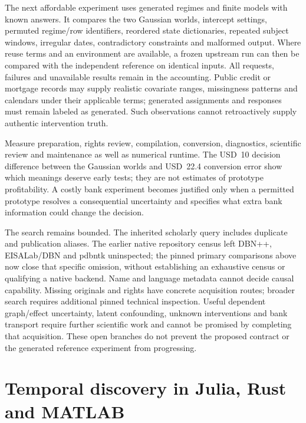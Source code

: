 The next affordable experiment uses generated regimes and finite models with
known answers. It compares the two Gaussian worlds, intercept settings,
permuted regime/row identifiers, reordered state dictionaries, repeated subject
windows, irregular dates, contradictory constraints and malformed output.
Where reuse terms and an environment are available, a frozen upstream run can
then be compared with the independent reference on identical inputs. All
requests, failures and unavailable results remain in the accounting. Public
credit or mortgage records may supply realistic covariate ranges, missingness
patterns and calendars under their applicable terms; generated assignments
and responses must remain labeled as generated. Such observations cannot
retroactively supply authentic intervention truth.

Measure preparation, rights review, compilation, conversion, diagnostics,
scientific review and maintenance as well as numerical runtime. The USD~10
decision difference between the Gaussian worlds and USD~22.4 conversion error
show which meanings deserve early tests; they are not estimates of prototype
profitability. A costly bank experiment becomes justified only when a permitted
prototype resolves a consequential uncertainty and specifies what extra bank
information could change the decision. \citep{exec16_ct_oracle,exec16_ct_design}

The search remains bounded. The inherited scholarly query includes duplicate
and publication aliases. The earlier native repository census left DBN++,
EISALab/DBN and pdbntk uninspected; the pinned primary comparisons above now
close that specific omission, without establishing an exhaustive census or
qualifying a native backend. Name and language metadata cannot decide causal
capability. Missing originals and rights
have concrete acquisition routes; broader search requires additional pinned
technical inspection. Useful dependent graph/effect uncertainty, latent
confounding, unknown interventions and bank transport require further
scientific work and cannot be promised by completing that acquisition.
These open branches do not prevent the proposed contract or the generated
reference experiment from progressing. \citep{exec16_ct_design}
\label{exec16:cxx-temporal-end}


\section{Temporal discovery in Julia, Rust and MATLAB}
\label{exec17:other-temporal}


